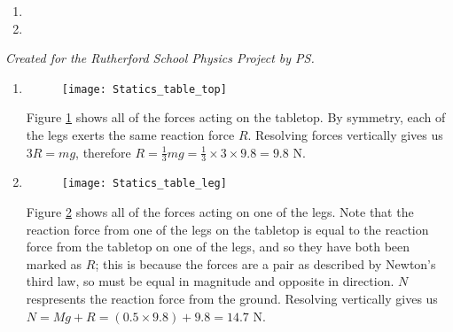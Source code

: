 
\begin{problem}
{
\begin{enumerate}
	\item  {}
	\item  {}
	\end{enumerate}
}
{\textit{Created for the Rutherford School Physics Project by PS.}}
{\begin{enumerate}
	\item
	\begin{figure} [h]
		\centering
		\texttt{[image: Statics\_table\_top]}
		\caption{}
		\label{fig:Statics_table_top}
	\end{figure}
	Figure \ref{fig:Statics_table_top} shows all of the forces acting on the tabletop. By symmetry, each of the legs exerts the same reaction force $R$. Resolving forces vertically gives us $3R = mg$, therefore $R = \frac{1}{3}mg = \frac{1}{3}\times 3 \times 9.8 = 9.8$ N.
	\item
	\begin{figure} [h]
		\centering
		\texttt{[image: Statics\_table\_leg]}
		\caption{}
		\label{fig:Statics_table_leg}
	\end{figure}
	Figure \ref{fig:Statics_table_leg} shows all of the forces acting on one of the legs. Note that the reaction force from one of the legs on the tabletop is equal to the reaction force from the tabletop on one of the legs, and so they have both been marked as $R$; this is because the forces are a pair as described by Newton's third law, so must be equal in magnitude and opposite in direction. $N$ respresents the reaction force from the ground. Resolving vertically gives us $N = Mg + R = \left(0.5\times 9.8\right) + 9.8 = 14.7$ N.
\end{enumerate}
}
\end{problem}